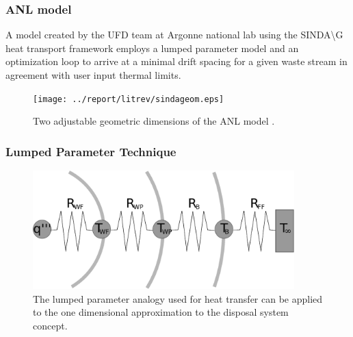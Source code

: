 
\begin{frame}
  \frametitle{ANL model}
  A model created by the UFD team at Argonne national lab using the 
  SINDA{\textbackslash}G heat transport framework employs a lumped parameter 
  model and an optimization loop to arrive at a minimal drift spacing for a 
  given waste stream in agreement with user input thermal limits. 
  \begin{figure}[h!]
    \begin{center}
      \texttt{[image: ../report/litrev/sindageom.eps]}
    \end{center}
    \caption{Two adjustable geometric dimensions of the ANL model 
    \cite{bauer_something_2010}.}
    \label{fig:sindageom}
  \end{figure}
\end{frame}


\begin{frame}[ctb!]
  \frametitle{Lumped Parameter Technique}
  \begin{figure}[h!]
    \begin{center}
      \includegraphics[width=0.9\textwidth]{lumpedParam.eps}
    \end{center}
    \caption{The lumped parameter analogy used for heat transfer can be applied 
    to the one dimensional approximation to the disposal system concept. }
    \label{fig:lumpedParam}
  \end{figure}
\end{frame}



